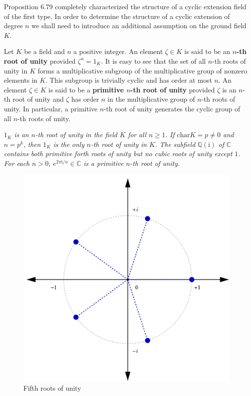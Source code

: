 Proposition 6.79 completely characterized the structure of a cyclic extension field of the first type. In order to determine the structure of a cyclic extension of degree $n$ we shall need to introduce an additional assumption on the ground field $K$.\par
Let $K$ be a field and $n$ a positive integer. An element $\zeta\in K$ is said to be an \textbf{$n$-th root of unity} provided $\zeta^n=1_K$. It is easy to see that the set of all $n$-th roots of unity in $K$ forms a multiplicative subgroup of the multiplicative group of nonzero elements in $K$. This subgroup is trivially cyclic and has order at most $n$. An element $\zeta\in K$ is said to be a \textbf{primitive $n$-th root of unity} provided $\zeta$ is an $n$-th root of unity and $\zeta$ has order $n$ in the multiplicative group of $n$-th roots of unity. In particular, a primitive $n$-th root of unity generates the cyclic group of all $n$-th roots of unity.
\begin{example}\em
$1_K$ is an $n$-th root of unity in the field $K$ for all $n\ge 1$. If $\mathrm{char}K=p\ne 0$ and $n=p^k$, then $1_K$ is the only $n$-th root of unity in $K$. The subfield $\mathbb{Q}(\mathrm{i})$ of $\mathbb{C}$ contains both primitive forth roots of unity but no cubic roots of unity except $1$. For each $n>0$, $e^{2\pi\mathrm{i}/n}\in\mathbb{C}$ is a primitive $n$-th root of unity.
\begin{figure}[htbp]
    \center
    \includegraphics[scale=0.19]{Images/1200px-One5Root.svg.png}
    \caption{Fifth roots of unity}
\end{figure}
\end{example}
